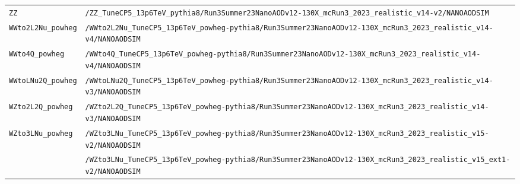 \begin{longtable}{@{}>{\RaggedRight\arraybackslash}p{} >{\RaggedRight\arraybackslash}p{}@{}}
\addlinespace[2pt]
\texttt{ZZ} & \texttt{/\allowbreak{}ZZ\_\allowbreak{}TuneCP5\_\allowbreak{}13p6TeV\_\allowbreak{}pythia8/\allowbreak{}Run3Summer23NanoAODv12-\allowbreak{}130X\_\allowbreak{}mcRun3\_\allowbreak{}2023\_\allowbreak{}realistic\_\allowbreak{}v14-\allowbreak{}v2/\allowbreak{}NANOAODSIM} \\
\addlinespace[2pt]
\texttt{WWto2L2Nu\_\allowbreak{}powheg} & \texttt{/\allowbreak{}WWto2L2Nu\_\allowbreak{}TuneCP5\_\allowbreak{}13p6TeV\_\allowbreak{}powheg-\allowbreak{}pythia8/\allowbreak{}Run3Summer23NanoAODv12-\allowbreak{}130X\_\allowbreak{}mcRun3\_\allowbreak{}2023\_\allowbreak{}realistic\_\allowbreak{}v14-\allowbreak{}v4/\allowbreak{}NANOAODSIM} \\
\addlinespace[2pt]
\texttt{WWto4Q\_\allowbreak{}powheg} & \texttt{/\allowbreak{}WWto4Q\_\allowbreak{}TuneCP5\_\allowbreak{}13p6TeV\_\allowbreak{}powheg-\allowbreak{}pythia8/\allowbreak{}Run3Summer23NanoAODv12-\allowbreak{}130X\_\allowbreak{}mcRun3\_\allowbreak{}2023\_\allowbreak{}realistic\_\allowbreak{}v14-\allowbreak{}v4/\allowbreak{}NANOAODSIM} \\
\addlinespace[2pt]
\texttt{WWtoLNu2Q\_\allowbreak{}powheg} & \texttt{/\allowbreak{}WWtoLNu2Q\_\allowbreak{}TuneCP5\_\allowbreak{}13p6TeV\_\allowbreak{}powheg-\allowbreak{}pythia8/\allowbreak{}Run3Summer23NanoAODv12-\allowbreak{}130X\_\allowbreak{}mcRun3\_\allowbreak{}2023\_\allowbreak{}realistic\_\allowbreak{}v14-\allowbreak{}v3/\allowbreak{}NANOAODSIM} \\
\addlinespace[2pt]
\texttt{WZto2L2Q\_\allowbreak{}powheg} & \texttt{/\allowbreak{}WZto2L2Q\_\allowbreak{}TuneCP5\_\allowbreak{}13p6TeV\_\allowbreak{}powheg-\allowbreak{}pythia8/\allowbreak{}Run3Summer23NanoAODv12-\allowbreak{}130X\_\allowbreak{}mcRun3\_\allowbreak{}2023\_\allowbreak{}realistic\_\allowbreak{}v14-\allowbreak{}v3/\allowbreak{}NANOAODSIM} \\
\addlinespace[2pt]
\texttt{WZto3LNu\_\allowbreak{}powheg} & \texttt{/\allowbreak{}WZto3LNu\_\allowbreak{}TuneCP5\_\allowbreak{}13p6TeV\_\allowbreak{}powheg-\allowbreak{}pythia8/\allowbreak{}Run3Summer23NanoAODv12-\allowbreak{}130X\_\allowbreak{}mcRun3\_\allowbreak{}2023\_\allowbreak{}realistic\_\allowbreak{}v15-\allowbreak{}v2/\allowbreak{}NANOAODSIM} \\
 & \texttt{/\allowbreak{}WZto3LNu\_\allowbreak{}TuneCP5\_\allowbreak{}13p6TeV\_\allowbreak{}powheg-\allowbreak{}pythia8/\allowbreak{}Run3Summer23NanoAODv12-\allowbreak{}130X\_\allowbreak{}mcRun3\_\allowbreak{}2023\_\allowbreak{}realistic\_\allowbreak{}v15\_\allowbreak{}ext1-\allowbreak{}v2/\allowbreak{}NANOAODSIM} \\

\end{longtable}
